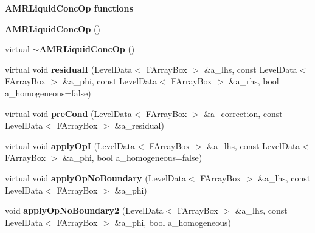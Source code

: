 \begin{Indent}{\bf A\-M\-R\-Liquid\-Conc\-Op functions}\par
\begin{DoxyCompactItemize}
\item 
\hypertarget{class_a_m_r_liquid_conc_op_a149898e0b9f9847b3f09f13453f731f8}{{\bfseries A\-M\-R\-Liquid\-Conc\-Op} ()}\label{class_a_m_r_liquid_conc_op_a149898e0b9f9847b3f09f13453f731f8}

\item 
\hypertarget{class_a_m_r_liquid_conc_op_a3e2dad1cad8210b0b14511825da41f01}{virtual {\bfseries $\sim$\-A\-M\-R\-Liquid\-Conc\-Op} ()}\label{class_a_m_r_liquid_conc_op_a3e2dad1cad8210b0b14511825da41f01}

\item 
\hypertarget{class_a_m_r_liquid_conc_op_a03da767b7d8ffb5d859789b3e78c7204}{virtual void {\bfseries residual\-I} (Level\-Data$<$ F\-Array\-Box $>$ \&a\-\_\-lhs, const Level\-Data$<$ F\-Array\-Box $>$ \&a\-\_\-phi, const Level\-Data$<$ F\-Array\-Box $>$ \&a\-\_\-rhs, bool a\-\_\-homogeneous=false)}\label{class_a_m_r_liquid_conc_op_a03da767b7d8ffb5d859789b3e78c7204}

\item 
\hypertarget{class_a_m_r_liquid_conc_op_a615c34edebf564c4eeee89f04df99d0a}{virtual void {\bfseries pre\-Cond} (Level\-Data$<$ F\-Array\-Box $>$ \&a\-\_\-correction, const Level\-Data$<$ F\-Array\-Box $>$ \&a\-\_\-residual)}\label{class_a_m_r_liquid_conc_op_a615c34edebf564c4eeee89f04df99d0a}

\item 
\hypertarget{class_a_m_r_liquid_conc_op_ac56ba156de1e5cda5501d7b9912a4f9e}{virtual void {\bfseries apply\-Op\-I} (Level\-Data$<$ F\-Array\-Box $>$ \&a\-\_\-lhs, const Level\-Data$<$ F\-Array\-Box $>$ \&a\-\_\-phi, bool a\-\_\-homogeneous=false)}\label{class_a_m_r_liquid_conc_op_ac56ba156de1e5cda5501d7b9912a4f9e}

\item 
\hypertarget{class_a_m_r_liquid_conc_op_aa0c98541f194b7e38bbfb0b0f66b12c6}{virtual void {\bfseries apply\-Op\-No\-Boundary} (Level\-Data$<$ F\-Array\-Box $>$ \&a\-\_\-lhs, const Level\-Data$<$ F\-Array\-Box $>$ \&a\-\_\-phi)}\label{class_a_m_r_liquid_conc_op_aa0c98541f194b7e38bbfb0b0f66b12c6}

\item 
\hypertarget{class_a_m_r_liquid_conc_op_a2bcfe932408290d8313ecd3f7cf94053}{void {\bfseries apply\-Op\-No\-Boundary2} (Level\-Data$<$ F\-Array\-Box $>$ \&a\-\_\-lhs, const Level\-Data$<$ F\-Array\-Box $>$ \&a\-\_\-phi, bool a\-\_\-homogeneous)}\label{class_a_m_r_liquid_conc_op_a2bcfe932408290d8313ecd3f7cf94053}


\end{DoxyCompactItemize}
\end{Indent}
